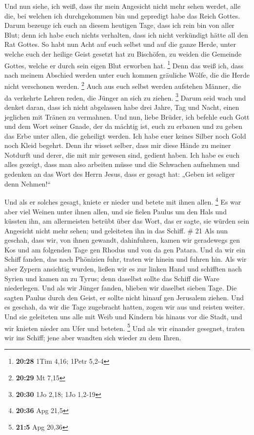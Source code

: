  Und nun siehe, ich weiß, dass ihr mein Angesicht nicht
mehr sehen werdet, alle die, bei welchen ich durchgekommen bin und
gepredigt habe das Reich Gottes.  Darum bezeuge ich euch
an diesem heutigen Tage, dass ich rein bin von aller Blut;
 denn ich habe euch nichts verhalten, dass ich nicht
verkündigt hätte all den Rat Gottes.  So habt nun Acht
auf euch selbst und auf die ganze Herde, unter welche euch der heilige
Geist gesetzt hat zu Bischöfen, zu weiden die Gemeinde Gottes, welche er
durch sein eigen Blut erworben hat. \footnote{\textbf{20:28} 1Tim 4,16;
  1Petr 5,2-4}  Denn das weiß ich, dass nach meinem
Abschied werden unter euch kommen gräuliche Wölfe, die die Herde nicht
verschonen werden. \footnote{\textbf{20:29} Mt 7,15} 
Auch aus euch selbst werden aufstehen Männer, die da verkehrte Lehren
reden, die Jünger an sich zu ziehen. \footnote{\textbf{20:30} 1Jo 2,18;
  1Jo 1,2-19}  Darum seid wach und denket daran, dass ich
nicht abgelassen habe drei Jahre, Tag und Nacht, einen jeglichen mit
Tränen zu vermahnen.  Und nun, liebe Brüder, ich befehle
euch Gott und dem Wort seiner Gnade, der da mächtig ist, euch zu erbauen
und zu geben das Erbe unter allen, die geheiligt werden. 
Ich habe euer keines Silber noch Gold noch Kleid begehrt.
 Denn ihr wisset selber, dass mir diese Hände zu meiner
Notdurft und derer, die mit mir gewesen sind, gedient haben.
 Ich habe es euch alles gezeigt, dass man also arbeiten
müsse und die Schwachen aufnehmen und gedenken an das Wort des Herrn
Jesus, dass er gesagt hat: „Geben ist seliger denn Nehmen!{}``

 Und als er solches gesagt, kniete er nieder und betete
mit ihnen allen. \footnote{\textbf{20:36} Apg 21,5}  Es
war aber viel Weinen unter ihnen allen, und sie fielen Paulus um den
Hals und küssten ihn,  am allermeisten betrübt über das
Wort, das er sagte, sie würden sein Angesicht nicht mehr sehen; und
geleiteten ihn in das Schiff. \# 21  Als nun geschah, dass
wir, von ihnen gewandt, dahinfuhren, kamen wir geradewegs gen Kos und am
folgenden Tage gen Rhodus und von da gen Patara.  Und da
wir ein Schiff fanden, das nach Phönizien fuhr, traten wir hinein und
fuhren hin.  Als wir aber Zypern ansichtig wurden, ließen
wir es zur linken Hand und schifften nach Syrien und kamen an zu Tyrus;
denn daselbst sollte das Schiff die Ware niederlegen.  Und
als wir Jünger fanden, blieben wir daselbst sieben Tage. Die sagten
Paulus durch den Geist, er sollte nicht hinauf gen Jerusalem ziehen.
 Und es geschah, da wir die Tage zugebracht hatten, zogen
wir aus und reisten weiter. Und sie geleiteten uns alle mit Weib und
Kindern bis hinaus vor die Stadt, und wir knieten nieder am Ufer und
beteten. \footnote{\textbf{21:5} Apg 20,36}  Und als wir
einander gesegnet, traten wir ins Schiff; jene aber wandten sich wieder
zu dem Ihren.

